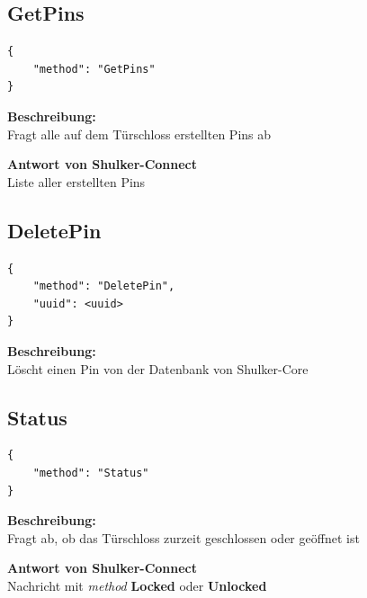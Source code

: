 \subsection{GetPins}
\begin{lstlisting}
{
    "method": "GetPins"
}
\end{lstlisting}

\textbf{Beschreibung:} \\
Fragt alle auf dem Türschloss erstellten Pins ab

\textbf{Antwort von Shulker-Connect} \\
Liste aller erstellten Pins



\subsection{DeletePin}
\begin{lstlisting}
{
    "method": "DeletePin",
    "uuid": <uuid>
}
\end{lstlisting}

\textbf{Beschreibung:} \\
Löscht einen Pin von der Datenbank von Shulker-Core



\subsection{Status}
\begin{lstlisting}
{
    "method": "Status"
}
\end{lstlisting}

\textbf{Beschreibung:} \\
Fragt ab, ob das Türschloss zurzeit geschlossen oder geöffnet ist

\textbf{Antwort von Shulker-Connect} \\
Nachricht mit \textit{method} \textbf{Locked} oder \textbf{Unlocked}